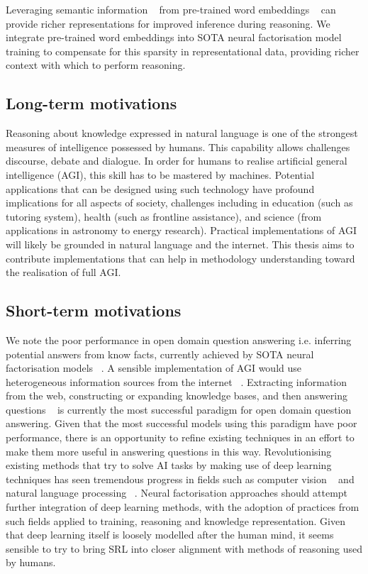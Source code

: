 \noindent Leveraging semantic information \unskip~\citep{socher2013reasoning} from pre-trained word embeddings \unskip~\citep{mikolov2013distributed} can provide richer representations for improved inference during reasoning. We integrate pre-trained word embeddings into SOTA neural factorisation model training to compensate for this sparsity in representational data, providing richer context with which to perform reasoning. 

\subsection{Long-term motivations} 

Reasoning about knowledge expressed in natural language is one of the strongest measures of intelligence possessed by humans. This capability allows challenges discourse, debate and dialogue. In order for humans to realise artificial general intelligence (AGI), this skill has to be mastered by machines. Potential applications that can be designed using such technology have profound implications for all aspects of society, challenges including in education (such as tutoring system), health (such as frontline assistance), and science (from applications in astronomy to energy research). Practical implementations of AGI will likely be grounded in natural language and the internet. This thesis aims to contribute implementations that can help in methodology understanding toward the realisation of full AGI.  

\subsection{Short-term motivations}

We note the poor performance in open domain question answering i.e. inferring potential answers from know facts, currently achieved by SOTA neural factorisation models \unskip~\citep{balazevic2019hypernetwork, dettmers2018convolutional}. A sensible implementation of AGI would use heterogeneous information sources from the internet \unskip~\citep{angeli2013philosophers}. Extracting information from the web, constructing or expanding knowledge bases, and then answering questions \unskip~\citep{shalaby2019beyond} is currently the most successful paradigm for open domain question answering. Given that the most successful models using this paradigm have poor performance, there is an opportunity to refine existing techniques in an effort to make them more useful in answering questions in this way. Revolutionising existing methods that try to solve AI tasks by making use of deep learning techniques has seen tremendous progress in fields such as computer vision \unskip~\citep{hudson2018compositional}  and natural language processing \unskip~\citep{peters2018deep}. Neural factorisation approaches should attempt further integration of deep learning methods, with the adoption of practices from such fields applied to training, reasoning and knowledge representation. Given that deep learning itself is loosely modelled after the human mind, it seems sensible to try to bring SRL into closer alignment with methods of reasoning used by humans. 

